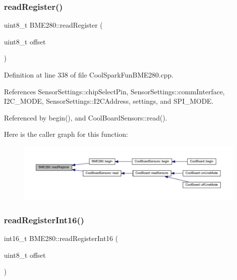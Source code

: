 \subsubsection{\texorpdfstring{read\+Register()}{readRegister()}}
{\footnotesize\ttfamily uint8\+\_\+t B\+M\+E280\+::read\+Register (\begin{DoxyParamCaption}\item[{uint8\+\_\+t}]{offset }\end{DoxyParamCaption})}



Definition at line 338 of file Cool\+Spark\+Fun\+B\+M\+E280.\+cpp.



References Sensor\+Settings\+::chip\+Select\+Pin, Sensor\+Settings\+::comm\+Interface, I2\+C\+\_\+\+M\+O\+DE, Sensor\+Settings\+::\+I2\+C\+Address, settings, and S\+P\+I\+\_\+\+M\+O\+DE.



Referenced by begin(), and Cool\+Board\+Sensors\+::read().

Here is the caller graph for this function\+:\nopagebreak
\begin{figure}[H]
\begin{center}
\leavevmode
\includegraphics[width=350pt]{df/dcf/class_b_m_e280_a1bbd14c8591966df531e40085342ff71_icgraph}
\end{center}
\end{figure}
\mbox{\label{class_b_m_e280_ac43c30f9b321d301694094d6b4bebe7e}} 
\subsubsection{\texorpdfstring{read\+Register\+Int16()}{readRegisterInt16()}}
{\footnotesize\ttfamily int16\+\_\+t B\+M\+E280\+::read\+Register\+Int16 (\begin{DoxyParamCaption}\item[{uint8\+\_\+t}]{offset }\end{DoxyParamCaption})}



